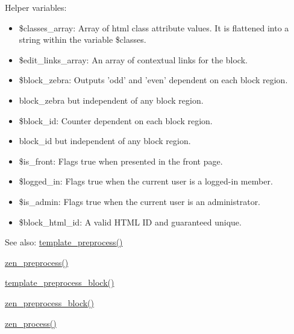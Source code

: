 Helper variables:\begin{itemize}
\item \$classes\_\-array: Array of html class attribute values. It is flattened into a string within the variable \$classes.\item \$edit\_\-links\_\-array: An array of contextual links for the block.\item \$block\_\-zebra: Outputs 'odd' and 'even' dependent on each block region.\item {}
block\_\-zebra but independent of any block region.\item \$block\_\-id: Counter dependent on each block region.\item {}
block\_\-id but independent of any block region.\item \$is\_\-front: Flags true when presented in the front page.\item \$logged\_\-in: Flags true when the current user is a logged-in member.\item \$is\_\-admin: Flags true when the current user is an administrator.\item \$block\_\-html\_\-id: A valid HTML ID and guaranteed unique.\end{itemize}


\begin{Desc}
\item[See also:]\hyperlink{includes_2theme_8inc_3eeb7bcdba7ef4859f99586da264d347}{template\_\-preprocess()} 

\hyperlink{sites_2all_2themes_2zen_2template_8php_34cb06c8098f8e1c710c501bb9a64d8b}{zen\_\-preprocess()} 

\hyperlink{includes_2theme_8inc_f4bcb538ddb98ffdd9ec8037631f10fa}{template\_\-preprocess\_\-block()} 

\hyperlink{sites_2all_2themes_2zen_2template_8php_1004cb430e9ecab4c4dc373a30e2340e}{zen\_\-preprocess\_\-block()} 

\hyperlink{sites_2all_2themes_2zen_2template_8php_3790b825810aa4bfd00c27c37817a7d8}{zen\_\-process()} \end{Desc}
